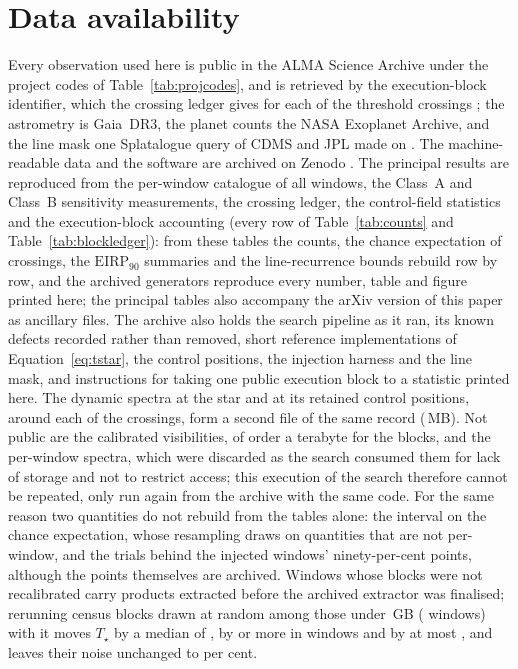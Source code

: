 \section*{Data availability}
\label{sec:data}
Every observation used here is public in the ALMA Science Archive under the
\NProjCodes{} project codes of Table~\ref{tab:projcodes}, and is retrieved by
the execution-block identifier, which the crossing ledger gives for each of the
\EvNCrossRaw{} threshold crossings \citep{Chen2022}; the astrometry is
Gaia~DR3, the planet counts the NASA Exoplanet Archive, and the line mask one
Splatalogue query of CDMS and JPL made on \McQueryDate. The machine-readable
data and the software are archived on Zenodo \citep{SIdeposit}. The principal
results are reproduced from the per-window catalogue of all \NWindows{}
windows, the Class~A and Class~B sensitivity measurements, the crossing
ledger, the control-field statistics and the execution-block accounting
(every row of Table~\ref{tab:counts} and Table~\ref{tab:blockledger}): from
these tables the counts, the chance expectation of \CeExp{} crossings, the
$\mathrm{EIRP}_{90}$ summaries and the line-recurrence bounds rebuild row by
row, and the archived generators reproduce every number, table and figure
printed here; the principal tables also accompany the arXiv version of this
paper as ancillary files. The archive also holds the search pipeline as it
ran, its known defects recorded rather than removed, short reference
implementations of Equation~\ref{eq:tstar}, the control positions, the
injection harness and the line mask, and instructions for taking one public
execution block to a statistic printed here. The dynamic spectra at the star
and at its \RcNRetCtrl{} retained control positions, around each of the
\DaNSpecCross{} crossings, form a second file of the same record
(\DaSpecFileMB\,MB). Not
public are the calibrated visibilities, of order a terabyte for the \NEB{}
blocks, and the per-window spectra, which were discarded as the search
consumed them for lack of storage and not to restrict access; this execution
of the search therefore cannot be repeated, only run again from the archive
with the same code. For the same reason two quantities do not rebuild from the
tables alone: the interval on the chance expectation, whose resampling draws
on quantities that are not per-window, and the trials behind the \SensNInj{}
injected windows' ninety-per-cent points, although the points themselves are
archived. Windows whose blocks were not recalibrated carry products extracted
before the archived extractor was finalised; rerunning \RflXvNBlkWord{} census
blocks drawn at random among those under \RflXvMaxGb\,GB (\RflXvNWin{} windows)
with it moves $T_\star$ by a median of \RflXvMedDT{}, by \RflXvBigTh{} or more in
\RflXvNBigWord{} windows and by at most \RflXvMaxDT{}, and leaves their noise
unchanged to \RflXvRmsPct{} per cent.
